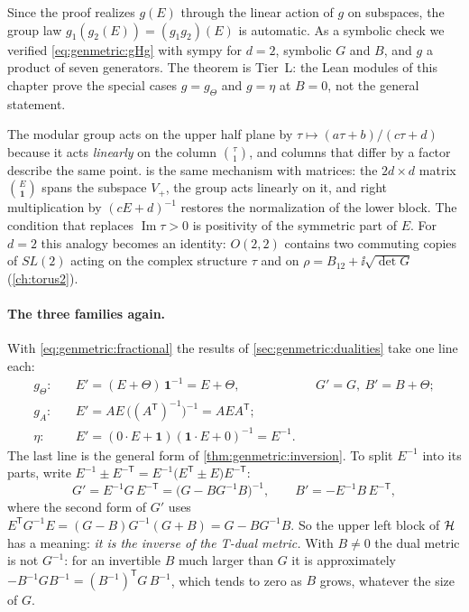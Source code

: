 \noindent Since the proof realizes $g(E)$ through the linear action of $g$ on subspaces,
the group law $g_1(g_2(E))=(g_1g_2)(E)$ is automatic. As a symbolic check we verified
\eqref{eq:genmetric:gHg} with sympy for $d=2$, symbolic $G$ and $B$, and $g$ a product of
seven generators. The theorem is Tier~L: the Lean modules of this chapter prove the special
cases $g=g_\Theta$ and $g=\eta$ at $B=0$, not the general statement.

\begin{physicsbox}
The modular group acts on the upper half plane by $\tau\mapsto(a\tau+b)/(c\tau+d)$ because
it acts \emph{linearly} on the column $\binom\tau1$, and columns that differ by a factor
describe the same point.  is the same mechanism with matrices:
the $2d\times d$ matrix $\binom E{\mathbf 1}$ spans the subspace $V_+$, the group acts
linearly on it, and right multiplication by $(cE+d)^{-1}$ restores the normalization of the
lower block. The condition that replaces $\operatorname{Im}\tau>0$ is positivity of the
symmetric part of $E$. For $d=2$ this analogy becomes an identity: $O(2,2)$ contains two
commuting copies of $SL(2)$ acting on the complex structure $\tau$ and on
$\rho=B_{12}+\ii\sqrt{\det G}$ (\cref{ch:torus2}).
\end{physicsbox}

\paragraph{The three families again.} With \eqref{eq:genmetric:fractional} the results of
\cref{sec:genmetric:dualities} take one line each:
\begin{equation}\label{eq:genmetric:threefam}
\begin{aligned}
 g_\Theta:&\quad E'=(E+\Theta)\,\mathbf 1^{-1}=E+\Theta, &&G'=G,\ B'=B+\Theta;\\
 g_A:&\quad E'=AE\,\big((A^{\mathsf T})^{-1}\big)^{-1}=AEA^{\mathsf T};\\
 \eta:&\quad E'=(0\cdot E+\mathbf 1)(\mathbf 1\cdot E+0)^{-1}=E^{-1}.
\end{aligned}
\end{equation}
The last line is the general form of \cref{thm:genmetric:inversion}. To split $E^{-1}$ into
its parts, write $E^{-1}\pm E^{-\mathsf T}=E^{-1}\big(E^{\mathsf T}\pm E\big)E^{-\mathsf T}$:
\begin{equation}\label{eq:genmetric:Einv}
 G'=E^{-1}G\,E^{-\mathsf T}=\big(G-BG^{-1}B\big)^{-1},\qquad
 B'=-E^{-1}B\,E^{-\mathsf T},
\end{equation}
where the second form of $G'$ uses $E^{\mathsf T}G^{-1}E=(G-B)G^{-1}(G+B)=G-BG^{-1}B$. So
the upper left block of $\mathcal{H}$ has a meaning: \emph{it is the inverse of the T-dual metric.}
With $B\neq0$ the dual metric is not $G^{-1}$: for an invertible $B$ much larger than
$G$ it is approximately $-B^{-1}GB^{-1}=(B^{-1})^{\mathsf T}G\,B^{-1}$, which tends to zero
as $B$ grows, whatever the size of $G$.

